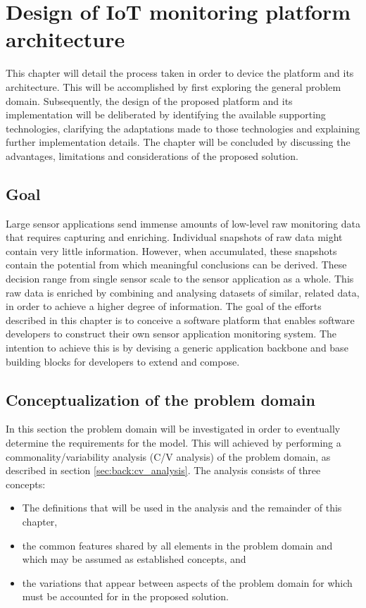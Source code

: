 \newcommand{\archid}{1}
\chapter{Design of IoT monitoring platform architecture}
\label{ch:architecture}
This chapter will detail the process taken in order to device the platform and its architecture. This will be accomplished by first exploring the general problem domain. Subsequently, the design of the proposed platform and its implementation will be deliberated by identifying the available supporting technologies, clarifying the adaptations made to those technologies and explaining further implementation details. The chapter will be concluded by discussing the advantages, limitations and considerations of the proposed solution.
\section{Goal}
Large sensor applications send immense amounts of low-level raw monitoring data that requires capturing and enriching. Individual snapshots of raw data might contain very little information. However, when accumulated, these snapshots contain the potential from which meaningful conclusions can be derived. These decision range from single sensor scale to the sensor application as a whole. This raw data is enriched by combining and analysing datasets of similar, related data, in order to achieve a higher degree of information. The goal of the efforts described in this chapter is to conceive a software platform that enables software developers to construct their own sensor application monitoring system. The intention to achieve this is by devising a generic application backbone and base building blocks for  developers to extend and compose.  
\section{Conceptualization of the problem domain}
In this section the problem domain will be investigated in order to eventually determine the requirements for the model. This will achieved by performing a commonality/variability analysis (C/V analysis) of the problem domain, as described in section \ref{sec:back:cv_analysis}. The analysis consists of three concepts:
\begin{itemize}
\nospace
\item The definitions that will be used in the analysis and the remainder of this chapter, 
\item the common features shared by all elements in the problem domain and which may be assumed as established concepts, and 
\item the variations that appear between aspects of the problem domain for which must be accounted for in the proposed solution.
\end{itemize}
